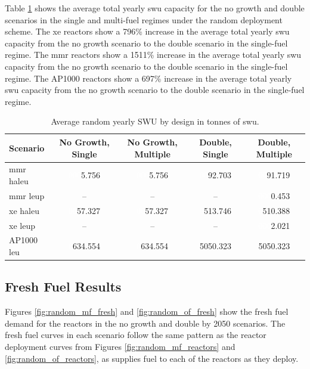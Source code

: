 Table \ref{tab:random_swu_avg} shows the average total yearly \gls{swu} capacity for the no growth and double scenarios in the single and multi-fuel regimes under the random deployment scheme. The \gls{xe} reactors show a 796\% increase in the average total yearly \gls{swu} capacity from the no growth scenario to the double scenario in the single-fuel regime. The \gls{mmr} reactors show a 1511\% increase in the average total yearly \gls{swu} capacity from the no growth scenario to the double scenario in the single-fuel regime. The AP1000 reactors show a 697\% increase in the average total yearly \gls{swu} capacity from the no growth scenario to the double scenario in the single-fuel regime.

\begin{table}[H]
    \centering
    \caption{Average random yearly SWU by design in tonnes of \gls{swu}.}
    \label{tab:random_swu_avg}
    \begin{tabular}{l c c c c}
       \hline
       Scenario & No Growth, Single & No Growth, Multiple & Double, Single & Double, Multiple  \\
       \hline
       \gls{mmr} \gls{haleu}   & \textcolor{white}{000}5.756   & \textcolor{white}{000}5.756   & \textcolor{white}{00}92.703    & \textcolor{white}{00}91.719   \\
       \gls{mmr} \gls{leup}    & --      & --      & --       & \textcolor{white}{000}0.453    \\
       \gls{xe} \gls{haleu}    & \textcolor{white}{00}57.327  & \textcolor{white}{00}57.327  & \textcolor{white}{0}513.746  & \textcolor{white}{0}510.388  \\
       \gls{xe} \gls{leup}     & --      & --      & --       & \textcolor{white}{000}2.021    \\
       AP1000 \gls{leu}        & \textcolor{white}{0}634.554 & \textcolor{white}{0}634.554 & 5050.323 & 5050.323 \\
       \hline
    \end{tabular}
\end{table}





\subsection{Fresh Fuel Results}
\label{sec:random_fresh}

Figures \ref{fig:random_mf_fresh} and \ref{fig:random_of_fresh} show the fresh fuel demand for the reactors in the no growth and double by 2050 scenarios. The fresh fuel curves in each scenario follow the same pattern as the reactor deployment curves from Figures \ref{fig:random_mf_reactors} and \ref{fig:random_of_reactors}, as \cyclus supplies fuel to each of the reactors as they deploy.


